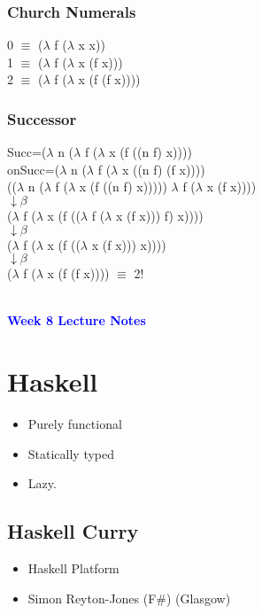 \documentclass{article}
\begin{document}
\subsubsection*{Church Numerals}
\begin{flushleft}
0 $\equiv$ ($\lambda$ f ($\lambda$ x x))\\
1 $\equiv$ ($\lambda$ f ($\lambda$ x (f x)))\\
2 $\equiv$ ($\lambda$ f ($\lambda$ x (f (f x))))
\end{flushleft}

\subsubsection*{Successor}
\begin{flushleft}
Succ=($\lambda$ n ($\lambda$ f ($\lambda$ x (f ((n f) x))))\\
onSucc=($\lambda$ n ($\lambda$ f ($\lambda$ x ((n f) (f x))))\\
(($\lambda$ n ($\lambda$ f ($\lambda$ x (f ((n f) x))))) $\lambda$ f ($\lambda$ x (f x))))\\
$\downarrow \beta$\\
($\lambda$ f ($\lambda$ x (f (($\lambda$ f ($\lambda$ x (f x))) f) x))))\\
$\downarrow \beta$\\
($\lambda$ f ($\lambda$ x (f (($\lambda$ x (f x))) x))))\\
$\downarrow \beta$\\
($\lambda$ f ($\lambda$ x (f (f x)))) $\equiv$ 2!
\end{flushleft}
\begin{flushleft}
\noindent\makebox[\linewidth]{\rule{\paperwidth}{0.4pt}}\\
\vspace*{1.5cm}
\textcolor{blue}{\textbf{{\huge Week 8 Lecture Notes}}}
\section*{Haskell}
\begin{itemize}
\item Purely functional 
\item Statically typed 
\item Lazy.
\end{itemize}
\end{flushleft}

\subsection*{Haskell Curry}
\begin{flushleft}
\begin{itemize}
\item Haskell Platform
\item Simon Reyton-Jones (F\#) (Glasgow) 
\end{itemize}
\end{flushleft}
\end{document}
